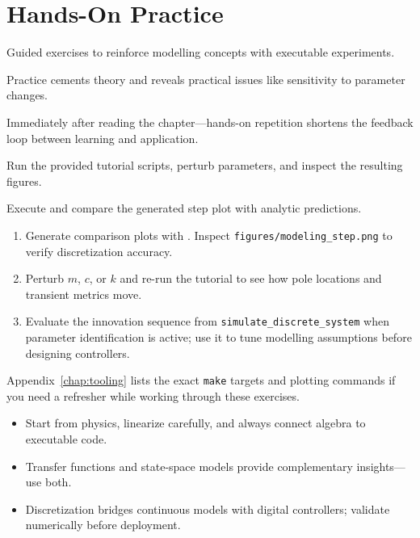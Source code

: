 \section{Hands-On Practice}
\begin{beginnerguide}
    \item[\textbf{What?}] Guided exercises to reinforce modelling concepts with executable experiments.
    \item[\textbf{Why?}] Practice cements theory and reveals practical issues like sensitivity to parameter changes.
    \item[\textbf{When?}] Immediately after reading the chapter—hands-on repetition shortens the feedback loop between learning and application.
    \item[\textbf{How?}] Run the provided tutorial scripts, perturb parameters, and inspect the resulting figures.
    \item[\textbf{Example}] Execute  and compare the generated step plot with analytic predictions.
\end{beginnerguide}
\begin{enumerate}[leftmargin=*]
    \item Generate comparison plots with . Inspect \texttt{figures/modeling\_step.png} to verify discretization accuracy.
    \item Perturb $m$, $c$, or $k$ and re-run the tutorial to see how pole locations and transient metrics move.
    \item Evaluate the innovation sequence from \texttt{simulate\_discrete\_system} when parameter identification is active; use it to tune modelling assumptions before designing controllers.
\end{enumerate}
Appendix~\ref{chap:tooling} lists the exact \texttt{make} targets and plotting commands if you need a refresher while working through these exercises.

\begin{takeaway}
\begin{itemize}[leftmargin=*]
    \item Start from physics, linearize carefully, and always connect algebra to executable code.
    \item Transfer functions and state-space models provide complementary insights—use both.
    \item Discretization bridges continuous models with digital controllers; validate numerically before deployment.
\end{itemize}
\end{takeaway}

